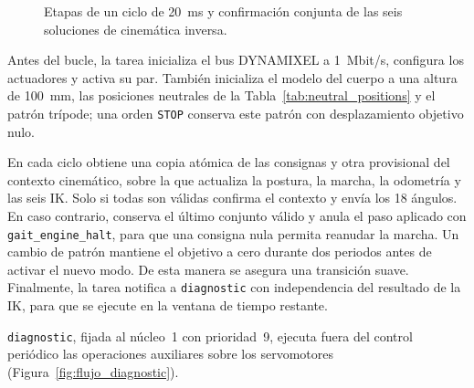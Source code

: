 \begin{figure}[H]
{}
	\captionsetup{justification=centering,singlelinecheck=false}
	\caption[Ciclo de locomoción como transacción]
	{Etapas de un ciclo de 20~ms y confirmación conjunta de las seis soluciones
	de cinemática inversa.}
    \label{fig:arquitectura_locomotion_task}
\end{figure}
\vspace{-1\baselineskip}

Antes del bucle, la tarea inicializa el bus DYNAMIXEL a 1~Mbit/s, configura los
actuadores y activa su par. También inicializa el modelo del cuerpo a una altura de 100~mm, las
posiciones neutrales de la Tabla~\ref{tab:neutral_positions} y el patrón trípode;
una orden \texttt{STOP} conserva este patrón con desplazamiento objetivo nulo.

En cada ciclo obtiene una copia atómica de las consignas y otra provisional del
contexto cinemático, sobre la que actualiza la postura, la marcha, la odometría y
las seis IK. Solo si todas son válidas confirma el contexto y envía los 18
ángulos. En caso contrario, conserva el último conjunto válido y anula el paso
aplicado con \texttt{gait\_engine\_halt}, para que una consigna nula permita
reanudar la marcha. Un cambio de
patrón mantiene el objetivo a cero durante dos periodos antes de activar el
nuevo modo. De esta manera se asegura una transición suave. Finalmente, la tarea notifica a \texttt{diagnostic} con
independencia del resultado de la IK, para que se ejecute en la ventana de tiempo restante.

\texttt{diagnostic}, fijada al núcleo~1 con prioridad~9, ejecuta fuera del control periódico las operaciones auxiliares sobre
los servomotores (Figura~\ref{fig:flujo_diagnostic}).

